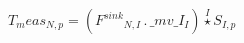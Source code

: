 \documentclass[border=2pt,12pt]{standalone}
\begin{document}
${T_meas}{_{N, p}}=\left({{F^{sink}}}{_{N, I}} \, . \, {\_mv\_I}{_{I}}\right) \stackrel{I}{\star} {{S}}{_{I, p}}$
\end{document}
